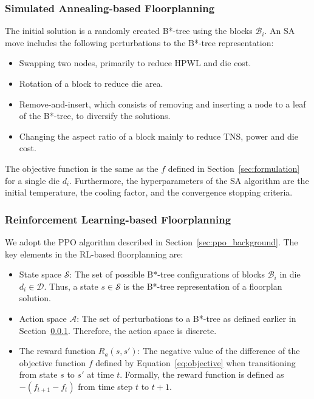 \subsubsection{Simulated Annealing-based Floorplanning}
\label{sec:sa}
The initial solution is a randomly created B*-tree using the blocks $\mathcal{B}_i$.
An SA move includes the following perturbations to the B*-tree representation:
\begin{itemize}
  \item Swapping two nodes, primarily to reduce HPWL and die cost.
  \item Rotation of a block to reduce die area.
  \item Remove-and-insert, which consists of removing and inserting a node to a leaf of the B*-tree, to diversify the solutions.
  \item Changing the aspect ratio of a block mainly to reduce TNS, power and die cost.
\end{itemize}
The objective function is the same as the $f$ defined in Section~\ref{sec:formulation} for a single die $d_i$. Furthermore, the hyperparameters of the SA algorithm are the initial temperature, %
the cooling factor, %
and the convergence stopping criteria. %

\subsubsection{Reinforcement Learning-based Floorplanning}
We adopt the PPO algorithm described in Section~\ref{sec:ppo_background}. 
The key elements in the RL-based floorplanning are:
\begin{itemize}
  \item State space $\mathcal{S}$: The set of possible B*-tree configurations of blocks $\mathcal{B}_i$ in die $d_i \in \mathcal{D}$. Thus, a state $s \in \mathcal{S}$ is the B*-tree representation of a floorplan solution.
  \item Action space $\mathcal{A}$: The set of perturbations to a B*-tree as defined earlier in Section~\ref{sec:sa}. Therefore, the action space is discrete.
  \item The reward function $R_a(s,s')$: The negative value of the difference of the objective function $f$ defined by Equation~\eqref{eq:objective} when transitioning from state $s$ to $s'$ at time $t$. Formally, the reward function is defined as $-(f_{t+1}-f_t)$ from time step $t$ to $t{+}1$.
\end{itemize}

